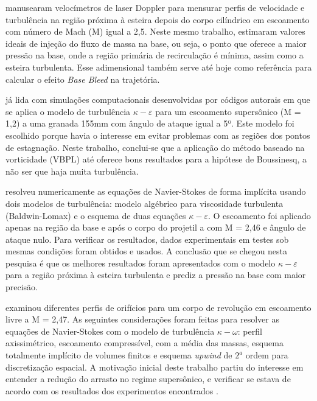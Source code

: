 \citeauthor{Mathur&Dutton1996} manusearam velocímetros de laser Doppler para mensurar perfis de velocidade e turbulência na região próxima à esteira depois do corpo cilíndrico em escoamento com número de Mach (M) igual a 2,5. Neste mesmo trabalho, estimaram valores ideais de injeção do fluxo de massa na base, ou seja, o ponto que oferece a maior pressão na base, onde a região primária de recirculação é mínima, assim como a esteira turbulenta. Esse adimensional também serve até hoje como referência para calcular o efeito \textit{Base Bleed} na trajetória. 

\citeauthor{Kauri1997} já lida com simulações computacionais desenvolvidas por códigos autorais em que se aplica o modelo de turbulência $\kappa-\varepsilon$ para um escoamento supersônico (M = 1,2) a uma granada 155mm com ângulo de ataque igual a 5º. Este modelo foi escolhido porque havia o interesse em evitar problemas com as regiões dos pontos de estagnação. Neste trabalho, conclui-se que a aplicação do método baseado na vorticidade (VBPL) até oferece bons resultados para a hipótese de Boussinesq, a não ser que haja muita turbulência. 

\citeauthor{Sahu1997} resolveu numericamente as equações de Navier-Stokes de forma implícita usando dois modelos de turbulência: modelo algébrico para viscosidade turbulenta (Baldwin-Lomax) e o esquema de duas equações $\kappa-\varepsilon$. O escoamento foi aplicado apenas na região da base e após o corpo do projetil a com M = 2,46 e ângulo de ataque nulo. Para verificar os resultados, dados experimentais em testes sob mesmas condições foram obtidos e usados. A conclusão que se chegou nesta pesquisa é que os melhores resultados foram apresentados com o modelo $\kappa-\varepsilon$ para a região próxima à esteira turbulenta e prediz a pressão na base com maior precisão.

\citeauthor{Lee2006Sep} examinou diferentes perfis de orifícios para um corpo de revolução em escoamento livre a M = 2,47. As seguintes considerações foram feitas para resolver as equações de Navier-Stokes com o modelo de turbulência $\kappa-\omega$: perfil axissimétrico, escoamento compressível, com a média das massas, esquema totalmente implícito de volumes finitos e esquema \textit{upwind} de $2^{a}$ ordem para discretização espacial. A motivação inicial deste trabalho partiu do interesse em entender a redução do arrasto no regime supersônico, e verificar se estava de acordo com os resultados dos experimentos encontrados \cite{Bourdon2003Feb}.


